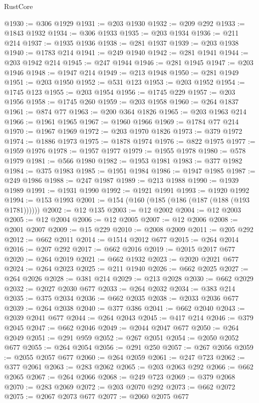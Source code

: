 \begin{lexlean}{RustCore}
\begin{coremodule}
@1930 := @306 @1929
@1931 := @203 @1930
@1932 := @209 @292
@1933 := @1843 @1932
@1934 := @306 @1933
@1935 := @203 @1934
@1936 := @211 @214
@1937 := @1935 @1936
@1938 := @281 @1937
@1939 := @203 @1938
@1940 := @1783 @214
@1941 := @249 @1940
@1942 := @281 @1941
@1944 := @203 @1942 @214
@1945 := @247 @1944
@1946 := @281 @1945
@1947 := @203 @1946
@1948 := @1947 @214
@1949 := @213 @1948
@1950 := @281 @1949
@1951 := @203 @1950
@1952 := @531 @123
@1953 := @203 @1952
@1954 := @1745 @123
@1955 := @203 @1954
@1956 := @1745 @229
@1957 := @203 @1956
@1958 := @1745 @260
@1959 := @203 @1958
@1960 := @264 @1837
@1961 := @874 @77
@1963 := @200 @364 @1826
@1965 := @203 @1963 @214
@1966 := @1961 @1965
@1967 := @1960 @1966
@1969 := @1784 @77 @214
@1970 := @1967 @1969
@1972 := @203 @1970 @1826
@1973 := @379 @1972
@1974 := @1886 @1973
@1975 := @1878 @1974
@1976 := @822 @1975
@1977 := @1959 @1976
@1978 := @1957 @1977
@1979 := @1955 @1978
@1980 := @578 @1979
@1981 := @566 @1980
@1982 := @1953 @1981
@1983 := @377 @1982
@1984 := @375 @1983
@1985 := @1951 @1984
@1986 := @1947 @1985
@1987 := @249 @1986
@1988 := @247 @1987
@1989 := @213 @1988
@1990 := @1939 @1989
@1991 := @1931 @1990
@1992 := @1921 @1991
@1993 := @1920 @1992
@1994 := @153 @1993
@2001 := @154 (@160 (@185 (@186 (@187 (@188 (@193 @1781))))))
@2002 := @12 @135
@2003 := @12 @2002
@2004 := @12 @2003
@2005 := @12 @2004
@2006 := @12 @2005
@2007 := @12 @2006
@2008 := @2001 @2007
@2009 := @15 @229
@2010 := @2008 @2009
@2011 := @205 @292
@2012 := @662 @2011
@2014 := @1514 @2012 @677
@2015 := @264 @2014
@2016 := @207 @292
@2017 := @662 @2016
@2019 := @2015 @2017 @677
@2020 := @264 @2019
@2021 := @662 @1932
@2023 := @2020 @2021 @677
@2024 := @264 @2023
@2025 := @211 @1940
@2026 := @662 @2025
@2027 := @264 @2026
@2028 := @381 @214
@2029 := @213 @2028
@2030 := @662 @2029
@2032 := @2027 @2030 @677
@2033 := @264 @2032
@2034 := @383 @214
@2035 := @375 @2034
@2036 := @662 @2035
@2038 := @2033 @2036 @677
@2039 := @264 @2038
@2040 := @377 @386
@2041 := @662 @2040
@2043 := @2039 @2041 @677
@2044 := @264 @2043
@2045 := @417 @214
@2046 := @379 @2045
@2047 := @662 @2046
@2049 := @2044 @2047 @677
@2050 := @264 @2049
@2051 := @291 @959
@2052 := @267 @2051
@2054 := @2050 @2052 @677
@2055 := @264 @2054
@2056 := @291 @250
@2057 := @267 @2056
@2059 := @2055 @2057 @677
@2060 := @264 @2059
@2061 := @247 @723
@2062 := @377 @2061
@2063 := @283 @2062
@2065 := @203 @2063 @292
@2066 := @662 @2065
@2067 := @264 @2066
@2068 := @249 @723
@2069 := @379 @2068
@2070 := @283 @2069
@2072 := @203 @2070 @292
@2073 := @662 @2072
@2075 := @2067 @2073 @677
@2077 := @2060 @2075 @677

\end{coremodule}
\end{lexlean}
